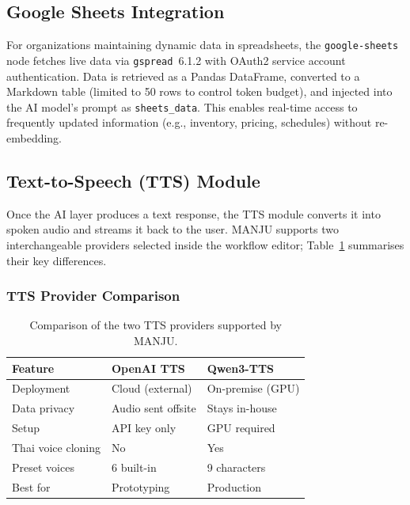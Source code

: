 \documentclass[10pt, a4paper, twocolumn]{article}
\begin{document}
\subsection{Google Sheets Integration}

For organizations maintaining dynamic data in spreadsheets, the \texttt{google-sheets} node fetches live data via \texttt{gspread}~6.1.2 with OAuth2 service account authentication.
Data is retrieved as a Pandas DataFrame, converted to a Markdown table (limited to 50 rows to control token budget), and injected into the AI model's prompt as \texttt{sheets\_data}.
This enables real-time access to frequently updated information (e.g., inventory, pricing, schedules) without re-embedding.

\subsection{Text-to-Speech (TTS) Module}
\label{sec:tts}

Once the AI layer produces a text response, the TTS module converts it
into spoken audio and streams it back to the user.
MANJU supports two interchangeable providers selected inside the workflow
editor; Table~\ref{tab:tts_options} summarises their key differences.

\subsubsection{TTS Provider Comparison}

\begin{table}[h]
    \centering
    \caption{Comparison of the two TTS providers supported by MANJU.}
    \label{tab:tts_options}
    \small
    \begin{tabular}{@{}lll@{}}
        \toprule
        \textbf{Feature} & \textbf{OpenAI TTS} & \textbf{Qwen3-TTS} \\
        \midrule
        Deployment    & Cloud (external)   & On-premise (GPU) \\
        Data privacy  & Audio sent offsite & Stays in-house \\
        Setup         & API key only       & GPU required \\
        Thai voice cloning & No            & Yes \\
        Preset voices & 6 built-in         & 9 characters \\
        Best for      & Prototyping        & Production \\
        \bottomrule
    \end{tabular}
\end{table}
\end{document}
